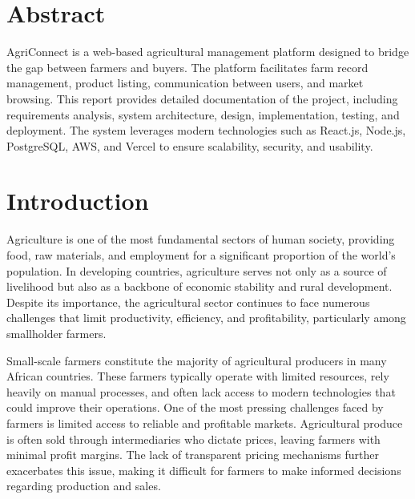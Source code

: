 \documentclass[12pt,a4paper]{article}
\begin{document}
\clearpage
\hypersetup{pageanchor=true}

\tableofcontents
\newpage

\listoffigures
\listoftables
\newpage
{}


\section{Abstract}
AgriConnect is a web-based agricultural management platform designed to bridge the gap between farmers and buyers. The platform facilitates farm record management, product listing, communication between users, and market browsing. This report provides detailed documentation of the project, including requirements analysis, system architecture, design, implementation, testing, and deployment. The system leverages modern technologies such as React.js, Node.js, PostgreSQL, AWS, and Vercel to ensure scalability, security, and usability.

\section{Introduction}

Agriculture is one of the most fundamental sectors of human society, providing food, raw materials, and employment for a significant proportion of the world’s population. In developing countries, agriculture serves not only as a source of livelihood but also as a backbone of economic stability and rural development. Despite its importance, the agricultural sector continues to face numerous challenges that limit productivity, efficiency, and profitability, particularly among smallholder farmers.

Small-scale farmers constitute the majority of agricultural producers in many African countries. These farmers typically operate with limited resources, rely heavily on manual processes, and often lack access to modern technologies that could improve their operations. One of the most pressing challenges faced by farmers is limited access to reliable and profitable markets. Agricultural produce is often sold through intermediaries who dictate prices, leaving farmers with minimal profit margins. The lack of transparent pricing mechanisms further exacerbates this issue, making it difficult for farmers to make informed decisions regarding production and sales.
\end{document}
